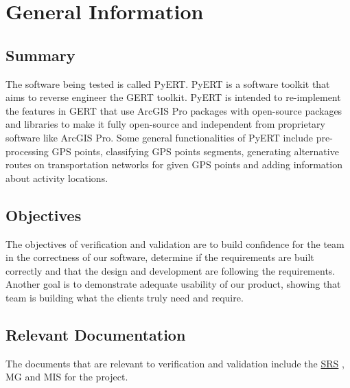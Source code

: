 \documentclass[12pt, titlepage]{article}
\begin{document}
\section{General Information}
\label{section:3}
\subsection{Summary}
The software being tested is called PyERT. PyERT is a software toolkit that aims to reverse engineer the GERT toolkit. PyERT is intended to re-implement the features in GERT that use ArcGIS Pro packages with open-source packages and libraries to make it fully open-source and independent from proprietary software like ArcGIS Pro. Some general functionalities of PyERT include pre-processing GPS points, classifying GPS points segments, generating alternative routes on transportation networks for given GPS points and adding information about activity locations.\\

\subsection{Objectives}
The objectives of verification and validation are to build confidence for the team in the correctness of our software, determine if the requirements are built correctly and that the design and development are following the requirements. Another goal is to demonstrate adequate usability of our product, showing that team is building what the clients truly need and require.\\

\subsection{Relevant Documentation}
The documents that are relevant to verification and validation include the \href{https://github.com/paezha/PyERT-BLACK/blob/main/docs/SRS/SRS.pdf}{SRS} \citep{SRS}, MG and MIS for the project.
\end{document}
